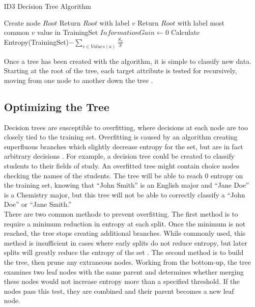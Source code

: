 \begin{algorithm}
  \caption{ID3 Decision Tree Algorithm}
  \begin{algorithmic}
    \State Create node $Root$
    \State Return $Root$ with label $v$
    \State Return $Root$ with label most common $v$ value in TrainingSet
    \Else
    \State $InformationGain \gets 0$
    \State Calculate Entropy(TrainingSet)$ - \sum_{v\in Values(a)}\frac{S_v}{S}$
    \EndFor
    \EndIf
    \EndProcedure
  \end{algorithmic}
\end{algorithm}

Once a tree has been created with the algorithm, it is simple to classify new data. Starting at the root of the tree, each target attribute is tested for recursively, moving from one node to another down the tree \cite{sega07}.\\

\subsection{Optimizing the Tree}
Decision trees are susceptible to overfitting, where decisions at each node are too closely tied to the training set. Overfitting is caused by an algorithm creating superfluous branches which slightly decrease entropy for the set, but are in fact arbitrary decisions \cite{sega07}. For example, a decision tree could be created to classify students to their fields of study. An overfitted tree might contain choice nodes checking the names of the students. The tree will be able to reach 0 entropy on the training set, knowing that ``John Smith'' is an English major and ``Jane Doe'' is a Chemistry major, but this tree will not be able to correctly classify a ``John Doe'' or ``Jane Smith.''\\

There are two common methods to prevent overfitting. The first method is to require a minimum reduction in entropy at each split. Once the minimum is not reached, the tree stops creating additional branches. While commonly used, this method is insufficient in cases where early splits do not reduce entropy, but later splits will greatly reduce the entropy of the set \cite{sega07}. The second method is to build the tree, then prune any extraneous nodes. Working from the bottom-up, the tree examines two leaf nodes with the same parent and determines whether merging these nodes would not increase entropy more than a specified threshold. If the nodes pass this test, they are combined and their parent becomes a new leaf node.\\

